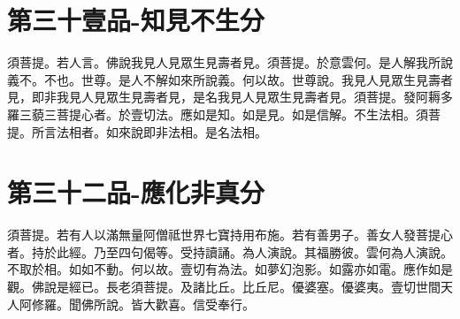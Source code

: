 \documentclass[a6paper, 22pt, twocolumn]{cvertbook}
\begin{document}
\chapter{第三十壹品-知見不生分}
\large 須菩提。若人言。佛說我見人見眾生見壽者見。須菩提。於意雲何。是人解我所說義不。不也。世尊。是人不解如來所說義。何以故。世尊說。我見人見眾生見壽者見，即非我見人見眾生見壽者見，是名我見人見眾生見壽者見。須菩提。發阿耨多羅三藐三菩提心者。於壹切法。應如是知。如是見。如是信解。不生法相。須菩提。所言法相者。如來說即非法相。是名法相。
\chapter{第三十二品-應化非真分}
\large 須菩提。若有人以滿無量阿僧祗世界七寶持用布施。若有善男子。善女人發菩提心者。持於此經。乃至四句偈等。受持讀誦。為人演說。其福勝彼。雲何為人演說。不取於相。如如不動。何以故。壹切有為法。如夢幻泡影。如露亦如電。應作如是觀。佛說是經已。長老須菩提。及諸比丘。比丘尼。優婆塞。優婆夷。壹切世間天人阿修羅。聞佛所說。皆大歡喜。信受奉行。
\end{document}
